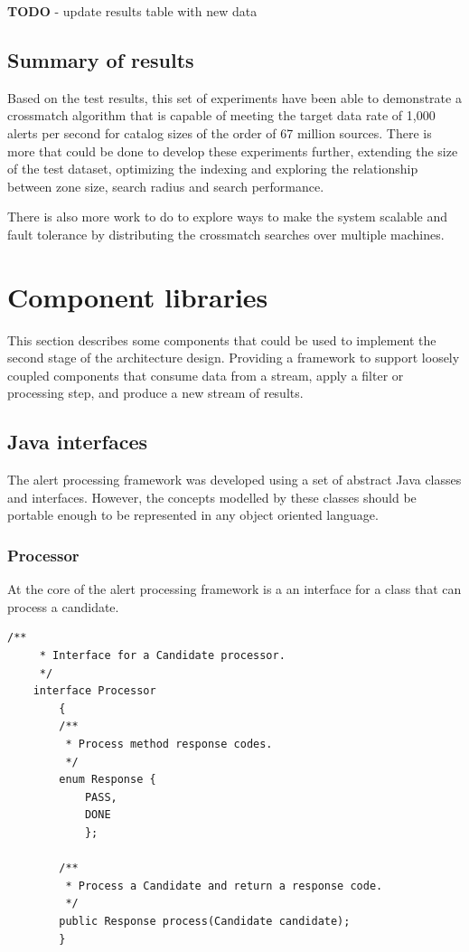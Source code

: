 \documentclass{article}
\newcommand{\crossmatch} {crossmatch\xspace}
\newcommand{\dataset} {dataset\xspace}
\newcommand{\catalog} {catalog\xspace}
\begin{document}
\textbf{TODO} - update results table with new data

\subsection{Summary of results}
\label{crossmatch-summary}

Based on the test results, this set of experiments have been able to demonstrate a \crossmatch algorithm that is capable of meeting the target data rate of 1,000 alerts per second for \catalog sizes of the order of 67 million sources. 
There is more that could be done to develop these experiments further, extending the size of the test \dataset, optimizing the indexing and exploring the relationship between zone size, search radius and search performance.

There is also more work to do to explore ways to make the system scalable and fault tolerance by distributing the \crossmatch searches over multiple machines.

\section{Component libraries}
\label{component-libraries}

This section describes some components that could be used to implement the second stage of the architecture design. Providing a framework to support loosely coupled components that consume data from a stream, apply a filter or processing step, and produce a new stream of results.

\subsection{Java interfaces}
\label{component-libraries.java-interfaces}

The alert processing framework was developed using a set of abstract Java classes and interfaces. However, the concepts modelled by these classes should be portable enough to be represented in any object oriented language.

\subsubsection{Processor}
\label{java-interfaces.Processor}

At the core of the alert processing framework is a an interface for a class that can process a candidate.

\begin{lstlisting}[style=Java]
    /**
     * Interface for a Candidate processor.
     */
    interface Processor
        {
        /**
         * Process method response codes.
         */
        enum Response {
            PASS,
            DONE
            };

        /**
         * Process a Candidate and return a response code.
         */
        public Response process(Candidate candidate);
        }
\end{lstlisting}
\end{document}
